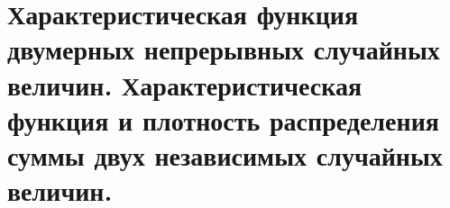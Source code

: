 \documentclass[polytech/stats/exam-2023/stats-exam-2023.tex]{subfiles}
\begin{document}
\section{Характеристическая функция двумерных непрерывных случайных величин. Характеристическая функция и плотность распределения суммы двух независимых случайных величин.}
\end{document}
